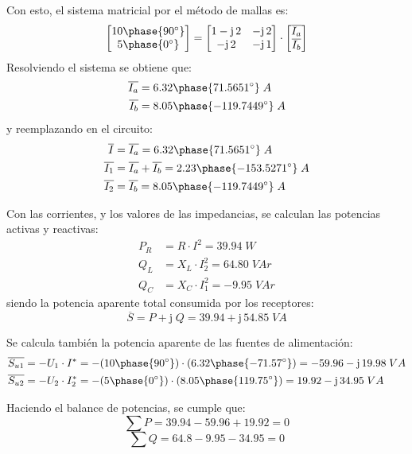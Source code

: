 \begin{example}
		Con esto, el sistema matricial por el método de mallas es: 
		\begin{equation*}
			\begin{bmatrix}
				10\phase{90^\circ} \\
				5\phase{0^\circ} 
			\end{bmatrix}
			=
			\begin{bmatrix}
				1-\mathrm{j}\,2 & -\mathrm{j}\,2 \\
				-\mathrm{j}\,2 & -\mathrm{j}\,1 \\
			\end{bmatrix}
			\cdot 
			\begin{bmatrix}
				\overline{I_a}\\
				\overline{I_b}
			\end{bmatrix}
		\end{equation*}
		Resolviendo el sistema se obtiene que:
		\begin{align*}
			\overline{I_a}&= 6.32\phase{71.5651^\circ}\;A\\
			\overline{I_b}&= 8.05\phase{-119.7449^\circ}\;A
		\end{align*}
		y reemplazando en el circuito: 
		\begin{align*}
			\overline{I}&=\overline{I_a}=6.32\phase{71.5651^\circ}\;A\\
			\overline{I_1}&=\overline{I_a}+\overline{I_b}=2.23\phase{-153.5271^\circ}\;A\\
			\overline{I_2}&=\overline{I_b}=8.05\phase{-119.7449^\circ}\;A
		\end{align*}
		
		
		Con las corrientes, y los valores de las impedancias, se calculan las potencias activas y reactivas:
		\begin{align*}
			P_R&=R\cdot I^2=39.94\;W\\
			Q_L &= X_L\cdot I_2^2=64.80\;VAr\\
			Q_C&=X_C\cdot I_1^2=-9.95\;VAr
		\end{align*}
		siendo la potencia aparente total consumida por los receptores:
		\begin{equation*}
			\overline{S}=P+\mathrm{j}\;Q=39.94+\mathrm{j}\,54.85\;VA
		\end{equation*}
		
		Se calcula también la potencia aparente de las fuentes de alimentación:
		\begin{align*}
			    \overline{S_{u1}}&=-U_1\cdot I^*=-(10\phase {90^\circ})\cdot (6.32\phase {-71.57^\circ})=-59.96-\mathrm{j}\,19.98\;VA\\
			    \overline{S_{u2}}&=-U_2\cdot I_2^*=-(5\phase{0^\circ})\cdot (8.05\phase{119.75^\circ})=19.92-\mathrm{j}\,34.95\;VA
			\end{align*}
		
		Haciendo el balance de potencias, se cumple que:
		\begin{equation*}
			    \sum P = 39.94-59.96+19.92=0
			\end{equation*}
		\begin{equation*}
			    \sum Q = 64.8-9.95-34.95=0
			\end{equation*}
	\end{example}
	
